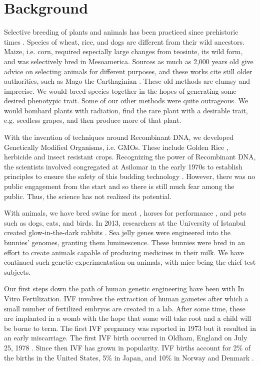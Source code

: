 \section{Background}
\label{sec:background}

Selective breeding of plants and animals has been practiced since prehistoric times \cite{Buffum1909}.
Species of wheat, rice, and dogs are different from their wild ancestors.
Maize, i.e. corn, required especially large changes from teosinte, its wild form, and was selectively bred in Mesoamerica.
Sources as much as 2,000 years old give advice on selecting animals for different purposes, and these works cite still older authorities, such as Mago the Carthaginian \cite{Lush2017}.
These old methods are clumsy and imprecise.
We would breed species together in the hopes of generating some desired phenotypic trait.
Some of our other methods were quite outrageous.
We would bombard plants with radiation, find the rare plant with a desirable trait, e.g. seedless grapes, and then produce more of that plant.

With the invention of techniques around Recombinant DNA, we developed Genetically Modified Organisms, i.e. GMOs.
These include Golden Rice \cite{Xudong2000}, herbicide \cite{Funke2006} and insect \cite{Paine2005} resistant crops.
Recognizing the power of Recombinant DNA, the scientists involved congregated at Asilomar in the early 1970s to establish principles to ensure the safety of this budding technology \cite{Berg1975}.
However, there was no public engagement from the start and so there is still much fear among the public.
Thus, the science has not realized its potential.

With animals, we have bred swine for meat \cite{OSU2011}, horses for performance \cite{Evans2000}, and pets such as dogs, cats, and birds.
In 2013, researchers at the University of Istanbul created glow-in-the-dark rabbits \cite{Rojhan2013}.
Sea jelly genes were engineered into the bunnies' genomes, granting them luminescence.
These bunnies were bred in an effort to create animals capable of producing medicines in their milk.
We have continued such genetic experimentation on animals, with mice being the chief test subjects.

Our first steps down the path of human genetic engineering have been with In Vitro Fertilization.
IVF involves the extraction of human gametes after which a small number of fertilized embryos are created in a lab.
After some time, these are implanted in a womb with the hope that some will take root and a child will be borne to term.
The first IVF pregnancy was reported in 1973 \cite{Kretzer1973} but it resulted in an early miscarriage.
The first IVF birth occurred in Oldham, England on July 25, 1978 \cite{Steptoe1978}.
Since then IVF has grown in popularity.
IVF births account for 2\% of the births in the United States, 5\% in Japan, and 10\% in Norway and Denmark \cite{Metzl2019}.

